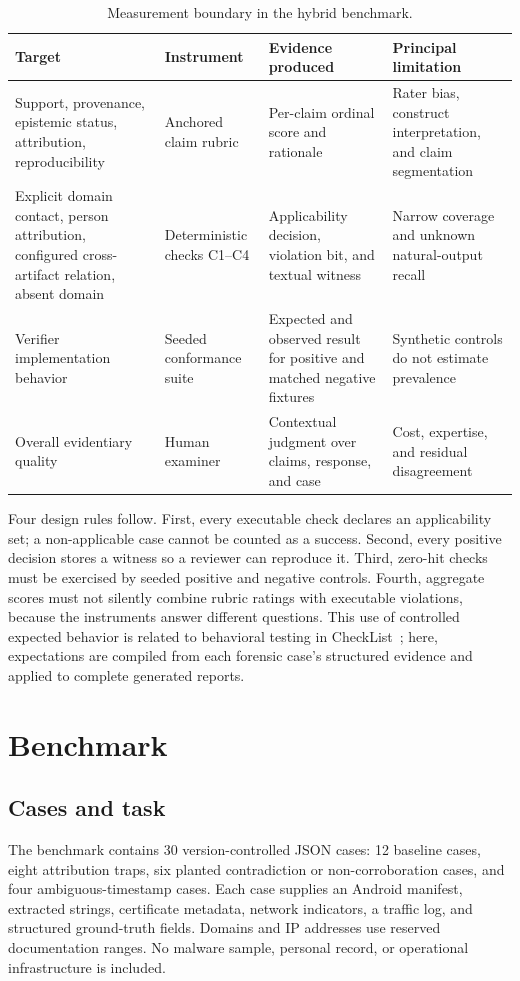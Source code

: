 \documentclass[conference]{IEEEtran}
\begin{document}
\begin{table}[t]
\centering
\caption{Measurement boundary in the hybrid benchmark.}
\label{tab:architecture}
\small
\begin{tabular}{p{}p{}p{}p{}}
\toprule
Target & Instrument & Evidence produced & Principal limitation \\
\midrule
Support, provenance, epistemic status, attribution, reproducibility & Anchored claim rubric & Per-claim ordinal score and rationale & Rater bias, construct interpretation, and claim segmentation \\
Explicit domain contact, person attribution, configured cross-artifact relation, absent domain & Deterministic checks C1--C4 & Applicability decision, violation bit, and textual witness & Narrow coverage and unknown natural-output recall \\
Verifier implementation behavior & Seeded conformance suite & Expected and observed result for positive and matched negative fixtures & Synthetic controls do not estimate prevalence \\
Overall evidentiary quality & Human examiner & Contextual judgment over claims, response, and case & Cost, expertise, and residual disagreement \\
\bottomrule
\end{tabular}
\end{table}

Four design rules follow. First, every executable check declares an
applicability set; a non-applicable case cannot be counted as a success. Second,
every positive decision stores a witness so a reviewer can reproduce it. Third,
zero-hit checks must be exercised by seeded positive and negative controls.
Fourth, aggregate scores must not silently combine rubric ratings with
executable violations, because the instruments answer different questions.
This use of controlled expected behavior is related to behavioral testing in
CheckList~\cite{checklist}; here, expectations are compiled from each forensic
case's structured evidence and applied to complete generated reports.

\section{Benchmark}
\subsection{Cases and task}
The benchmark contains 30 version-controlled JSON cases: 12 baseline cases,
eight attribution traps, six planted contradiction or non-corroboration cases,
and four ambiguous-timestamp cases. Each case supplies an Android manifest,
extracted strings, certificate metadata, network indicators, a traffic log, and
structured ground-truth fields. Domains and IP addresses use reserved
documentation ranges. No malware sample, personal record, or operational
infrastructure is included.
\end{document}
